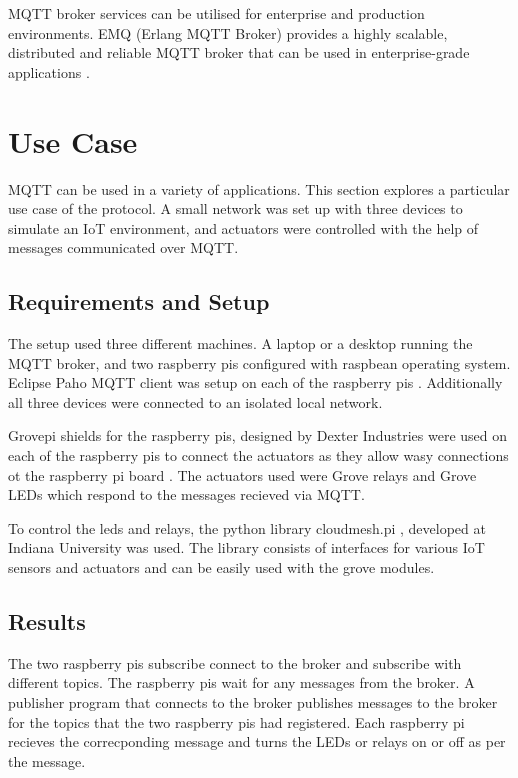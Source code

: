 \documentclass[sigconf]{acmart}
\begin{document}
MQTT broker services can be utilised for enterprise and production
environments. EMQ (Erlang MQTT Broker) provides a highly scalable,
distributed and reliable MQTT broker that can be used in
enterprise-grade applications \cite{erlang-mqtt-broker}.


\section{Use Case}

MQTT can be used in a variety of applications. This section explores a
particular use case of the protocol. A small network was set up with
three devices to simulate an IoT environment, and actuators were
controlled with the help of messages communicated over MQTT.

\subsection{Requirements and Setup}

The setup used three different machines. A laptop or a desktop running
the MQTT broker, and two raspberry pis configured with raspbean
operating system. Eclipse Paho MQTT client was setup on each of the
raspberry pis \cite{python-paho-mqtt}. Additionally all three devices
were connected to an isolated local network.

Grovepi shields for the raspberry pis, designed by Dexter Industries
were used on each of the raspberry pis to connect the actuators as
they allow wasy connections ot the raspberry pi board \cite{grovepi}.
The actuators used were Grove relays \cite{grove-relay} and Grove LEDs
\cite{grove-led} which respond to the messages recieved via MQTT.

To control the leds and relays, the python library cloudmesh.pi
\cite{cloudmesh.pi}, developed at Indiana University was used. The
library consists of interfaces for various IoT sensors and actuators
and can be easily used with the grove modules.



\subsection{Results}

The two raspberry pis subscribe connect to the broker and subscribe
with different topics. The raspberry pis wait for any messages from
the broker. A publisher program that connects to the broker publishes
messages to the broker for the topics that the two raspberry pis had
registered. Each raspberry pi recieves the correcponding message and
turns the LEDs or relays on or off as per the message.
\end{document}
